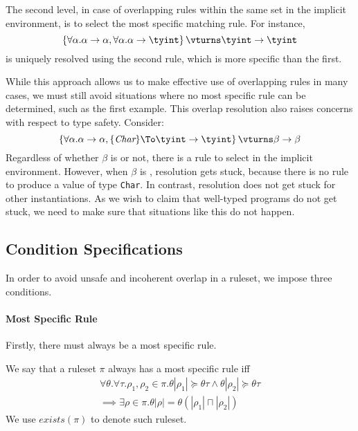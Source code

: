 The second level, in case of
overlapping rules within the same set in the implicit environment, is to
select the most specific matching rule. For instance,
\begin{equation*}
\left\{ \forall \alpha. \alpha \rightarrow \alpha,  
        \forall \alpha. \alpha \rightarrow \tyint \right\} \vturns \tyint \rightarrow \tyint
\end{equation*}
is uniquely resolved using the second rule, which is more specific than the first.

While this approach allows us to make effective use of overlapping rules in many
cases, we must still avoid situations where no most specific rule can be determined,
such as the first example.
This overlap resolution also raises concerns with respect to type safety. Consider:
\begin{equation*}
\left\{ \forall \alpha. \alpha \rightarrow \alpha,  
        \{\textit{Char}\} \To  \tyint \rightarrow \tyint \right\} \vturns \beta \rightarrow \beta
\end{equation*}
Regardless of whether $\beta$ is \tyint or not, there is a rule to select
in the implicit environment. However, when $\beta$ is \tyint, resolution
gets stuck, because there is no rule to produce a value of type \texttt{Char}.
In contrast, resolution does not get stuck for other instantiations.
As we wish to claim that well-typed programs do not get stuck, we need to make
sure that situations like this do not happen. 

\subsection{Condition Specifications} 

In order to avoid unsafe and incoherent overlap in a ruleset, we impose three
conditions.

\paragraph{Most Specific Rule}
Firstly, there must always be a most specific rule.
\begin{definition}
We say that a ruleset $\pi$ always has a most specific rule iff
\[
\begin{array}{l}
  \forall \theta.\forall \tau.\rho_1,\rho_2\in\pi.
  \theta|\rho_1| \succeq \theta\tau \wedge \theta|\rho_2| \succeq \theta\tau \\
  \implies \exists \rho \in \pi. \theta|\rho| = \theta(|\rho_1| \sqcap |\rho_2|)
\end{array}
\]
We use $\mathit{exists}(\pi)$ to denote such ruleset.
\end{definition}

